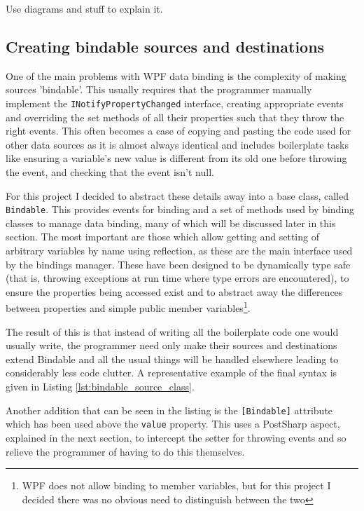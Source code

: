 \documentclass[12pt,twoside,notitlepage]{report}
\begin{document}
Use diagrams and stuff to explain it.

\subsection{Creating bindable sources and destinations}

One of the main problems with WPF data binding is the complexity of making sources 'bindable'. This usually requires that the programmer manually implement the \texttt{INotifyPropertyChanged} interface, creating appropriate events and overriding the set methods of all their properties such that they throw the right events. This often becomes a case of copying and pasting the code used for other data sources as it is almost always identical and includes boilerplate tasks like ensuring a variable's new value is different from its old one before throwing the event, and checking that the event isn't null.

For this project I decided to abstract these details away into a base class, called \texttt{Bindable}. This provides events for binding and a set of methods used by binding classes to manage data binding, many of which will be discussed later in this section. The most important are those which allow getting and setting of arbitrary variables by name using reflection, as these are the main interface used by the bindings manager. These have been designed to be dynamically type safe (that is, throwing exceptions at run time where type errors are encountered), to ensure the properties being accessed exist and to abstract away the differences between properties and simple public member variables\footnote{WPF does not allow binding to member variables, but for this project I decided there was no obvious need to distinguish between the two}.

The result of this is that instead of writing all the boilerplate code one would usually write, the programmer need only make their sources and destinations extend Bindable and all the usual things will be handled elsewhere leading to considerably less code clutter. A representative example of the final syntax is given in Listing \ref{lst:bindable_source_class}.

Another addition that can be seen in the listing is the \texttt{[Bindable]} attribute which has been used above the \texttt{value} property. This uses a PostSharp aspect, explained in the next section, to intercept the setter for throwing events and so relieve the programmer of having to do this themselves.
\end{document}
